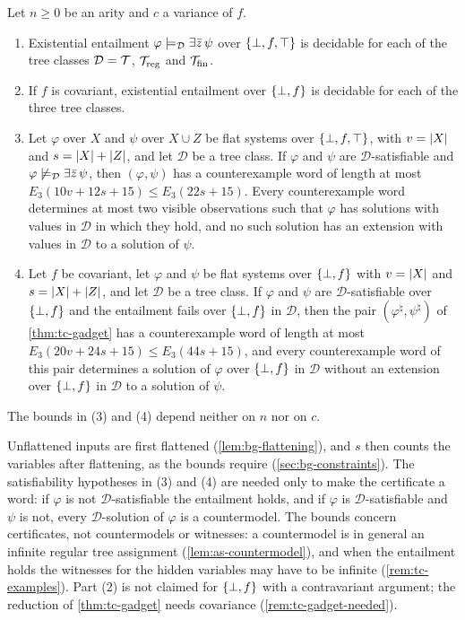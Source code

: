 \begin{theorem}\label{thm:as-main}
Let $n\ge0$ be an arity and $c$ a variance of $f$.
\begin{enumerate}[leftmargin=*]
\item Existential entailment $\varphi\models_{\mathcal D}\exists\bar z\,\psi$ over
  $\{\bot,f,\top\}$ is decidable for each of the tree classes $\mathcal D=\mathcal{T}$,
  $\mathcal{T}_{\mathrm{reg}}$ and $\mathcal{T}_{\mathrm{fin}}$.
\item If $f$ is covariant, existential entailment over $\{\bot,f\}$ is decidable for
  each of the three tree classes.
\item Let $\varphi$ over $X$ and $\psi$ over $X\cup Z$ be flat systems over
  $\{\bot,f,\top\}$, with $v=\lvert X\rvert$ and $s=\lvert X\rvert+\lvert Z\rvert$, and let $\mathcal D$ be a tree
  class. If $\varphi$ and $\psi$ are $\mathcal D$-satisfiable and
  $\varphi\not\models_{\mathcal D}\exists\bar z\,\psi$, then $(\varphi,\psi)$ has a
  counterexample word of length at most $E_3(10v+12s+15)\le E_3(22s+15)$.
  Every counterexample word determines at most two visible observations such
  that $\varphi$ has solutions with values in $\mathcal D$ in which they hold,
  and no such solution has an extension with values in $\mathcal D$ to a
  solution of $\psi$.
\item Let $f$ be covariant, let $\varphi$ and $\psi$ be flat systems over
  $\{\bot,f\}$ with $v=\lvert X\rvert$ and $s=\lvert X\rvert+\lvert Z\rvert$, and let $\mathcal D$ be a tree
  class. If
  $\varphi$ and $\psi$ are $\mathcal D$-satisfiable over $\{\bot,f\}$ and the
  entailment fails over $\{\bot,f\}$ in $\mathcal D$, then the pair
  $(\varphi^\natural,\psi^\natural)$ of \cref{thm:tc-gadget} has a
  counterexample word of length at most $E_3(20v+24s+15)\le E_3(44s+15)$, and
  every counterexample word of this pair determines a solution of $\varphi$
  over $\{\bot,f\}$ in $\mathcal D$ without an extension over $\{\bot,f\}$ in $\mathcal D$ to
  a solution of $\psi$.
\end{enumerate}
The bounds in (3) and (4) depend neither on $n$ nor on $c$.
\end{theorem}

Unflattened inputs are first flattened (\cref{lem:bg-flattening}), and $s$
then counts the variables after flattening, as the bounds require
(\cref{sec:bg-constraints}). The satisfiability hypotheses in (3) and (4) are
needed only to make the certificate a word: if $\varphi$ is not
$\mathcal D$-satisfiable the entailment holds, and if $\varphi$ is
$\mathcal D$-satisfiable and $\psi$ is not, every $\mathcal D$-solution of
$\varphi$ is a countermodel. The bounds concern certificates, not
countermodels or witnesses: a countermodel is in general an infinite regular
tree assignment (\cref{lem:as-countermodel}), and when the entailment holds the witnesses for the hidden variables may have
to be infinite (\cref{rem:tc-examples}). Part (2) is not claimed for $\{\bot,f\}$
with a contravariant argument; the reduction of \cref{thm:tc-gadget} needs
covariance (\cref{rem:tc-gadget-needed}).

